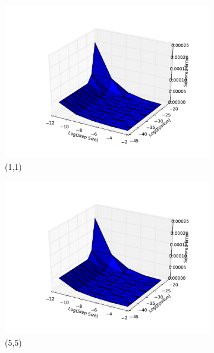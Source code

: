 \documentclass[10pt,psamsfonts]{amsart}
\theoremstyle{definition}
\theoremstyle{remark}
\numberwithin{equation}{section}
\begin{document}
\begin{figure}
	\centering
	\begin{subfigure}[b]{0.23\textwidth}
		\includegraphics[width=\textwidth]{hw1_1-2_0.pdf}
		\caption{(1,1)}
	\end{subfigure}
	\begin{subfigure}[b]{0.23\textwidth}
		\includegraphics[width=\textwidth]{hw1_1-2_1.pdf}
		\caption{(5,5)}
	\end{subfigure}
	\begin{subfigure}[b]{0.23\textwidth}

\end{subfigure}
\end{figure}
\end{document}

